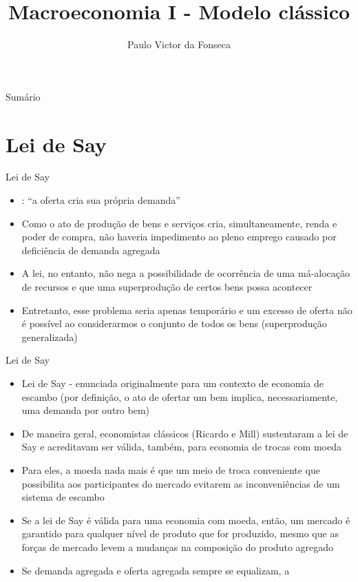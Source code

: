 \documentclass[10pt]{beamer}
\title[]{Macroeconomia I - Modelo clássico}
\author[]{Paulo Victor da Fonseca}
\date{}
\begin{document}
\begin{frame}[plain]
    \titlepage{
        \begin{center}
            \begin{minipage}{\textwidth}
                \centering
            \end{minipage}
        \end{center}}
\end{frame}

\begin{frame}{Sumário}
    \tableofcontents
\end{frame}

\section{Lei de Say}
\begin{frame}
    {Lei de Say}
    \begin{itemize}
        \item {}: ``a oferta cria sua própria demanda'' \bigskip
        \item Como o ato de produção de bens e serviços cria, simultaneamente, renda e poder de compra, não haveria impedimento ao pleno emprego causado por deficiência de demanda agregada\bigskip
        \item A lei, no entanto, não nega a possibilidade de ocorrência de uma má-alocação de recursos e que uma superprodução de certos bens possa acontecer\bigskip
        \item Entretanto, esse problema seria apenas temporário e um excesso de oferta não é possível ao considerarmos o conjunto de todos os bens (superprodução generalizada) 
    \end{itemize}
\end{frame}

\begin{frame}
    {Lei de Say}
    \begin{itemize}
        \item Lei de Say - enunciada originalmente para um contexto de economia de escambo (por definição, o ato de ofertar um bem implica, necessariamente, uma demanda por outro bem)\bigskip
        \item De maneira geral, economistas clássicos (Ricardo e Mill) sustentaram a lei de Say e acreditavam ser válida, também, para economia de trocas com moeda\bigskip
        \item Para eles, a moeda nada mais é que um meio de troca conveniente que possibilita aos participantes do mercado evitarem as inconveniências de um sistema de escambo\bigskip
        \item Se a lei de Say é válida para uma economia com moeda, então, um mercado é garantido para qualquer nível de produto que for produzido, mesmo que as forças de mercado levem a mudanças na composição do produto agregado\bigskip
        \item Se demanda agregada e oferta agregada sempre se equalizam, a 
    \end{itemize}
\end{frame}
\end{document}
